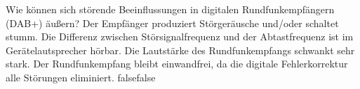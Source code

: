     {Wie können sich störende Beeinflussungen in digitalen Rundfunkempfängern (DAB+) äußern?}
    {Der Empfänger produziert Störgeräusche und/oder schaltet stumm.}
    {Die Differenz zwischen Störsignalfrequenz und der Abtastfrequenz ist im Gerätelautsprecher hörbar.}
    {Die Lautstärke des Rundfunkempfangs schwankt sehr stark.}
    {Der Rundfunkempfang bleibt einwandfrei, da die digitale Fehlerkorrektur alle Störungen eliminiert.}
    {false}{false}